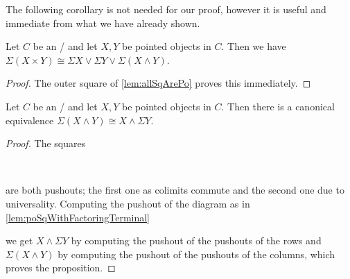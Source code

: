The following corollary is not needed for our proof, however it is useful and immediate from what we have already shown.
\begin{corollary}
    Let $C$ be an \inftytop/ and let $X,Y$ be pointed objects in $C$. 
    Then we have $\Sigma\left(X\times Y\right)\cong\Sigma X\vee\Sigma Y\vee\Sigma\left(X\wedge Y\right)$.
    \begin{proof}
        The outer square of \cref{lem:allSqArePo} proves this immediately. 
    \end{proof}
\end{corollary}
\begin{lemma}\label{lem:suspensionCommutesWithSmash}
    Let $C$ be an \inftytop/ and let $X,Y$ be pointed objects in $C$. 
    Then there is a canonical equivalence $\Sigma\left(X\wedge Y\right)\cong X\wedge\Sigma Y$.
    \begin{proof}
        The squares
        \begin{center}
            \
        \end{center}
        are both pushouts; the first one as colimits commute and the second one due to universality.
        Computing the pushout of the diagram as in \cref{lem:poSqWithFactoringTerminal}
        \begin{center}
        \end{center}
        we get $X\wedge\Sigma Y$ by computing the pushout of the pushouts of the rows and $\Sigma\left(X\wedge Y\right)$ by computing the pushout of the pushouts of the columns, which proves the proposition.
    \end{proof}
\end{lemma}
